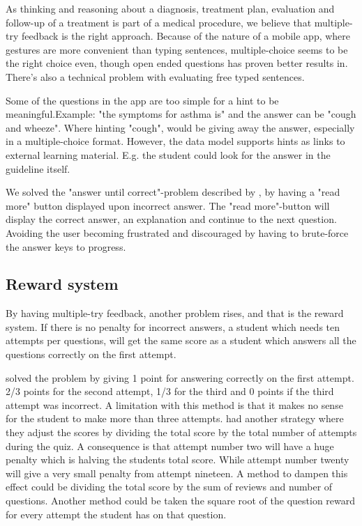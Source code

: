 

As thinking and reasoning about a diagnosis, treatment plan, evaluation and follow-up of a treatment is part of a medical procedure, we believe that multiple-try feedback is the right approach. Because of the nature of a mobile app, where gestures are more convenient than typing sentences, multiple-choice seems to be the right choice even, though open ended questions has proven better results in. There's also a technical problem with evaluating free typed sentences.

Some of the questions in the app are too simple for a hint to be meaningful.Example: "the symptoms for asthma is" and the answer can be "cough and wheeze". Where hinting "cough", would be giving away the answer, especially in a multiple-choice format. However, the data model supports hints as links to external learning material. E.g. the student could look for the answer in the guideline itself.

We solved the "answer until correct"-problem described by \textcite{Morrison1995}, by having a "read more" button displayed upon incorrect answer. The "read more"-button will display the correct answer, an explanation and continue to the next question. Avoiding the user becoming frustrated and discouraged by having to brute-force the answer keys to progress.




\subsection{Reward system}
By having multiple-try feedback, another problem rises, and that is the reward system. If there is no penalty for incorrect answers, a student which needs ten attempts per questions, will get the same score as a student which answers all the questions correctly on the first attempt.

\textcite{Attali2015} solved the problem by giving 1 point for answering correctly on the first attempt. 2/3 points for the second attempt, 1/3 for the third and 0 points if the third attempt was incorrect. A limitation with this method is that it makes no sense for the student to make more than three attempts. \textcite{Morrison1995} had another strategy where they adjust the scores by dividing the total score by the total number of attempts during the quiz. A consequence is that attempt number two will have a huge penalty which is halving the students total score. While attempt number twenty will give a very small penalty from attempt nineteen. A method to dampen this effect could be dividing the total score by the sum of reviews and number of questions. Another method could be taken the square root of the question reward for every attempt the student has on that question.

